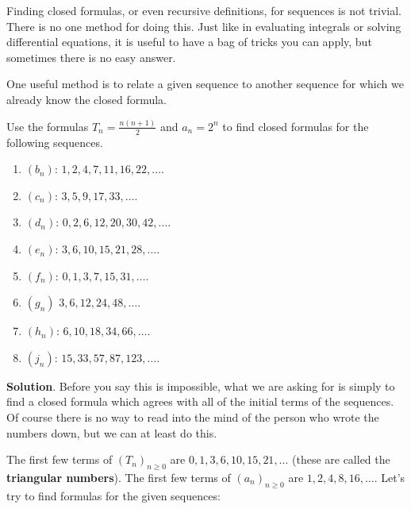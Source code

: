 \documentclass[11pt,]{book}
\newcommand{\terminology}[1]{\textbf{#1}}
\theoremstyle{ptxplainnotitle}
\theoremstyle{ptxplaintitle}
\theoremstyle{ptxdefinitionnotitle}
\theoremstyle{ptxdefinitiontitle}
\theoremstyle{ptxdefinitionnotitle}
\theoremstyle{ptxdefinitiontitle}
\theoremstyle{ptxdefinitionnotitle}
\theoremstyle{ptxdefinitiontitle}
\theoremstyle{ptxdefinitiontitlenonumber}
\theoremstyle{ptxdefinitiontitlenonumber}
\numberwithin{equation}{chapter}
\begin{document}
\hypertarget{p-58}{}%
Finding closed formulas, or even recursive definitions, for sequences is not trivial. There is no one method for doing this. Just like in evaluating integrals or solving differential equations, it is useful to have a bag of tricks you can apply, but sometimes there is no easy answer.%
\par
\hypertarget{p-59}{}%
One useful method is to relate a given sequence to another sequence for which we already know the closed formula.%
\begin{example}\label{example-4}
\hypertarget{p-60}{}%
Use the formulas \(T_n = \frac{n(n+1)}{2}\) and \(a_n = 2^n\) to find closed formulas for the following sequences. \leavevmode%
\begin{enumerate}
\item\hypertarget{li-34}{}\hypertarget{p-61}{}%
\((b_n)\): \(1, 2, 4, 7, 11, 16, 22, \ldots \).%
\item\hypertarget{li-35}{}\hypertarget{p-62}{}%
\((c_n)\): \(3, 5, 9, 17, 33,\ldots \).%
\item\hypertarget{li-36}{}\hypertarget{p-63}{}%
\((d_n)\): \(0, 2, 6, 12, 20, 30, 42,\ldots \).%
\item\hypertarget{li-37}{}\hypertarget{p-64}{}%
\((e_n)\): \(3, 6, 10, 15, 21, 28, \ldots\).%
\item\hypertarget{li-38}{}\hypertarget{p-65}{}%
\((f_n)\): \(0, 1, 3, 7, 15, 31, \ldots \).%
\item\hypertarget{li-39}{}\hypertarget{p-66}{}%
\((g_n)\) \(3, 6, 12, 24, 48, \ldots \).%
\item\hypertarget{li-40}{}\hypertarget{p-67}{}%
\((h_n)\): \(6, 10, 18, 34, 66, \ldots \).%
\item\hypertarget{li-41}{}\hypertarget{p-68}{}%
\((j_n)\): \(15, 33, 57, 87, 123, \ldots\).%
\end{enumerate}
%
\par\smallskip%
\noindent\textbf{Solution}.\hypertarget{solution-3}{}\quad%
\hypertarget{p-69}{}%
Before you say this is impossible, what we are asking for is simply to find a closed formula which agrees with all of the initial terms of the sequences. Of course there is no way to read into the mind of the person who wrote the numbers down, but we can at least do this.%
\par
\hypertarget{p-70}{}%
The first few terms of \((T_n)_{n\ge 0}\)\label{notation-2}
 are \(0, 1, 3, 6, 10, 15, 21, \ldots\) (these are called the \terminology{triangular numbers}). The first few terms of \((a_n)_{n\ge 0}\) are \(1, 2, 4, 8, 16, \ldots\).  Let's try to find formulas for the given sequences: \leavevmode%

\end{example}
\end{document}
